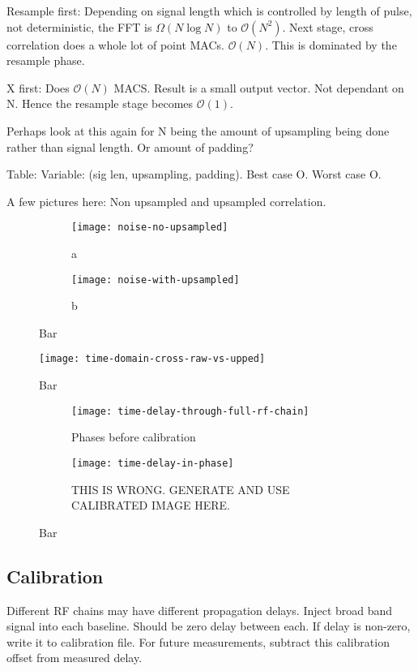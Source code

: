 Resample first:
Depending on signal length which is controlled by length of pulse, not deterministic, the FFT is \(\Omega(N\log{N})\) to \(\mathcal{O}(N^2)\). Next stage, cross correlation does a whole lot of point MACs. \(\mathcal{O}(N)\). This is dominated by the resample phase. 

X first: Does \(\mathcal{O}(N)\) MACS. Result is a small output vector. Not dependant on N. Hence the resample stage becomes \(\mathcal{O}(1)\). 

Perhaps look at this again for N being the amount of upsampling being done rather than signal length. Or amount of padding?

Table: Variable: (sig len, upsampling, padding). Best case O. Worst case O. 

A few pictures here:
Non upsampled and upsampled correlation.
\begin{figure}
  \centering
  \begin{subfigure}[b]{0.49\textwidth}
    \centering
    \texttt{[image: noise-no-upsampled]}
    \caption{a}
  \end{subfigure}
  \begin{subfigure}[b]{0.49\textwidth}
    \centering
    \texttt{[image: noise-with-upsampled]}
    \caption{b}
  \end{subfigure}
  \caption{Bar}
\end{figure}

\begin{figure}
  \centering
  \texttt{[image: time-domain-cross-raw-vs-upped]}
  \caption{Bar}
  \label{fig:software-aseaweawea}
\end{figure}

\begin{figure}
  \centering
  \begin{subfigure}[b]{0.49\textwidth}
    \centering
    \texttt{[image: time-delay-through-full-rf-chain]}
    \caption{Phases before calibration}
  \end{subfigure}
  \begin{subfigure}[b]{0.49\textwidth}
    \centering
    \texttt{[image: time-delay-in-phase]}
    \caption{THIS IS WRONG. GENERATE AND USE CALIBRATED IMAGE HERE.}
  \end{subfigure}
  \caption{Bar}
\end{figure}

\subsection{Calibration}
Different RF chains may have different propagation delays. 
Inject broad band signal into each baseline. Should be zero delay between each. 
If delay is non-zero, write it to calibration file.
For future measurements, subtract this calibration offset from measured delay. 

